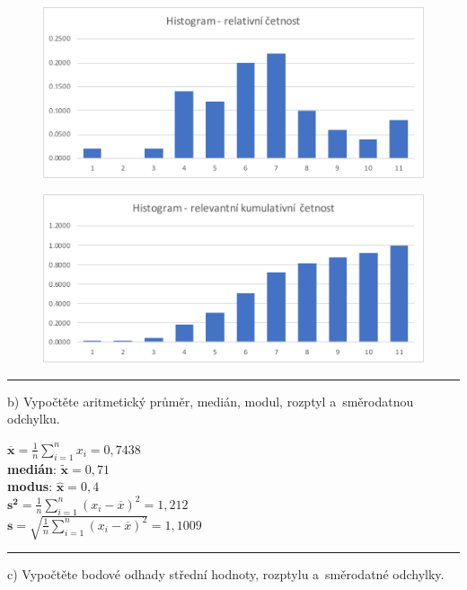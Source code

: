 \documentclass[a4paper, 11pt]{article}
\begin{document}
	\begin{figure}[H]
		\centering
		\includegraphics[width=.7 \linewidth]{img/1-a-rel-cet.pdf}
	\end{figure}

	\begin{figure}[H]
		\centering
		\includegraphics[width=.7 \linewidth]{img/1-a-rel-kum-cet.pdf}
	\end{figure}

	\vspace{1em}\noindent\rule{\textwidth}{.5pt}\vspace{1em}

	b) Vypočtěte aritmetický průměr, medián, modul, rozptyl a~směrodatnou
	odchylku.
	\vspace{1em}

	$ \boldsymbol{\overline{x}} = \frac{1}{n} \sum\limits_{i = 1}^n x_i =
	0,7438 $ \\
	\textbf{medián}: $ \boldsymbol{\widetilde{x}} = 0,71 $ \\
	\textbf{modus}: $ \boldsymbol{\hat{x}} = 0,4 $ \\
	$ \boldsymbol{s^2} = \frac{1}{n} \sum\limits_{i = 1}^n (x_i -
	\overline{x})^2 = 1,212 $ \\
	$ \boldsymbol{s} = \sqrt{\frac{1}{n} \sum\limits_{i = 1}^n (x_i -
	\overline{x})^2} = 1,1009 $

	\vspace{1em}\noindent\rule{\textwidth}{.5pt}\vspace{1em}

	c) Vypočtěte bodové odhady střední hodnoty, rozptylu a~směrodatné
	odchylky.
	\vspace{1em}
\end{document}
